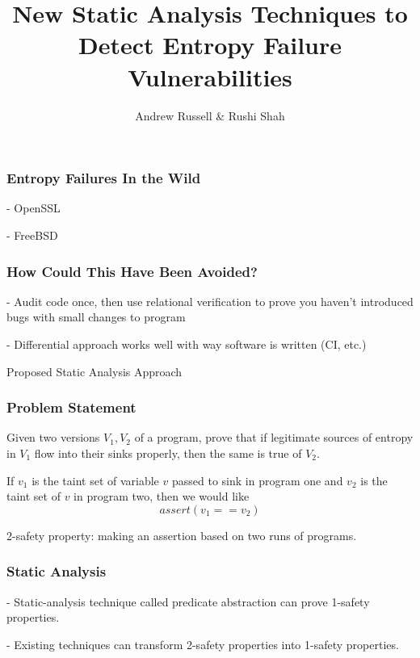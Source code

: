 \documentclass{beamer} %
\title{New Static Analysis Techniques to Detect Entropy Failure Vulnerabilities}
\author{Andrew Russell \& Rushi Shah}
\institute{The University of Texas at Austin}
\theoremstyle{definition} %
\begin{document}
\begin{frame}
\titlepage
\end{frame}

\begin{frame}
\frametitle{Entropy Failures In the Wild}
	 - OpenSSL

	 - FreeBSD
\end{frame}

\begin{frame}
\frametitle{How Could This Have Been Avoided?}
	- Audit code once, then use relational verification to prove you haven't introduced bugs with small changes to program

	- Differential approach works well with way software is written (CI, etc.)
\end{frame}

\begin{frame}
	Proposed Static Analysis Approach
\end{frame}

\begin{frame}
\frametitle{Problem Statement}

	Given two versions $V_1, V_2$ of a program, prove that if legitimate sources of entropy in $V_1$ flow into their sinks properly, then the same is true of $V_2$. 

	If $v_1$ is the taint set of variable $v$ passed to sink in program one and $v_2$ is the taint set of $v$ in program two, then we would like \[assert(v_1 == v_2)\]

	2-safety property: making an assertion based on two runs of programs. 


\end{frame}

\begin{frame}
\frametitle{Static Analysis}

	- Static-analysis technique called predicate abstraction can prove 1-safety properties. 

	- Existing techniques can transform 2-safety properties into 1-safety properties.



\end{frame}
\end{document}
